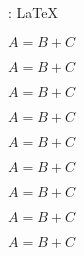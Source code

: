 \documentclass[10pt, a4paper]{../main/main}
\begin{document}
\tdocinlatex{\LaTeX} : \LaTeX


\begin{tdoclatex}
	$A = B + C$
\end{tdoclatex}

\begin{tdoclatex}[sbs]
	$A = B + C$
\end{tdoclatex}

\begin{tdoclatex}[code]
	$A = B + C$
\end{tdoclatex}

\vspace{16cm}

\begin{tdoclatex}[code]
	$A = B + C$

	$A = B + C$

	$A = B + C$

	$A = B + C$

	$A = B + C$

	$A = B + C$
\end{tdoclatex}
\end{document}
